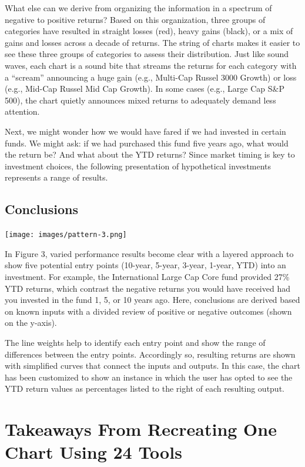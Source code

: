 \documentclass[]{book}
\begin{document}
What else can we derive from organizing the information in a spectrum of negative to positive returns? Based on this organization, three groups of categories have resulted in straight losses (red), heavy gains (black), or a mix of gains and losses across a decade of returns. The string of charts makes it easier to see these three groups of categories to assess their distribution. Just like sound waves, each chart is a sound bite that streams the returns for each category with a ``scream'' announcing a huge gain (e.g., Multi-Cap Russel 3000 Growth) or loss (e.g., Mid-Cap Russel Mid Cap Growth). In some cases (e.g., Large Cap S\&P 500), the chart quietly announces mixed returns to adequately demand less attention.

Next, we might wonder how we would have fared if we had invested in certain funds. We might ask: if we had purchased this fund five years ago, what would the return be? And what about the YTD returns? Since market timing is key to investment choices, the following presentation of hypothetical investments represents a range of results.

\hypertarget{conclusions}{%
\subsection{Conclusions}\label{conclusions}}

\texttt{[image: images/pattern-3.png]}

In Figure 3, varied performance results become clear with a layered approach to show five potential entry points (10-year, 5-year, 3-year, 1-year, YTD) into an investment. For example, the International Large Cap Core fund provided 27\% YTD returns, which contrast the negative returns you would have received had you invested in the fund 1, 5, or 10 years ago. Here, conclusions are derived based on known inputs with a divided review of positive or negative outcomes (shown on the y-axis).

The line weights help to identify each entry point and show the range of differences between the entry points. Accordingly so, resulting returns are shown with simplified curves that connect the inputs and outputs. In this case, the chart has been customized to show an instance in which the user has opted to see the YTD return values as percentages listed to the right of each resulting output.

\hypertarget{takeaways-from-recreating-one-chart-using-24-tools}{%
\section{Takeaways From Recreating One Chart Using 24 Tools}\label{takeaways-from-recreating-one-chart-using-24-tools}}
\end{document}
